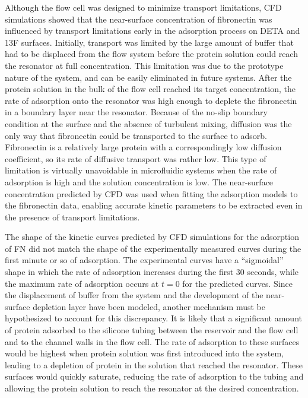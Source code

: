 Although the flow cell was designed to minimize transport limitations,
CFD simulations showed that the near-surface concentration of fibronectin
was influenced by transport limitations early in the adsorption process
on DETA and 13F surfaces. Initially, transport was limited by the
large amount of buffer that had to be displaced from the flow system
before the protein solution could reach the resonator at full concentration.
This limitation was due to the prototype nature of the system, and
can be easily eliminated in future systems. After the protein solution
in the bulk of the flow cell reached its target concentration, the
rate of adsorption onto the resonator was high enough to deplete the
fibronectin in a boundary layer near the resonator. Because of the
no-slip boundary condition at the surface and the absence of turbulent
mixing, diffusion was the only way that fibronectin could be transported
to the surface to adsorb. Fibronectin is a relatively large protein
with a correspondingly low diffusion coefficient, so its rate of diffusive
transport was rather low. This type of limitation is virtually unavoidable
in microfluidic systems when the rate of adsorption is high and the
solution concentration is low. The near-surface concentration predicted
by CFD was used when fitting the adsorption models to the fibronectin
data, enabling accurate kinetic parameters to be extracted even in
the presence of transport limitations.

The shape of the kinetic curves predicted by CFD simulations for the
adsorption of FN did not match the shape of the experimentally measured
curves during the first minute or so of adsorption. The experimental
curves have a {}``sigmoidal'' shape in which the rate of adsorption
increases during the first 30 seconds, while the maximum rate of adsorption
occurs at $t=0$ for the predicted curves. Since the displacement
of buffer from the system and the development of the near-surface
depletion layer have been modeled, another mechanism must be hypothesized
to account for this discrepancy. It is likely that a significant amount
of protein adsorbed to the silicone tubing between the reservoir and
the flow cell and to the channel walls in the flow cell. The rate
of adsorption to these surfaces would be highest when protein solution
was first introduced into the system, leading to a depletion of protein
in the solution that reached the resonator. These surfaces would quickly
saturate, reducing the rate of adsorption to the tubing and allowing
the protein solution to reach the resonator at the desired concentration.

